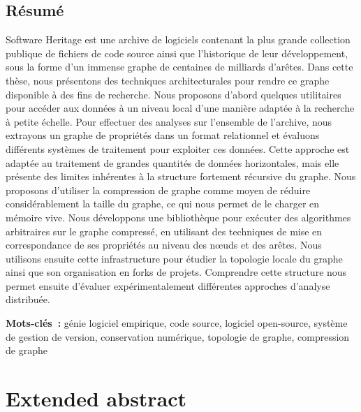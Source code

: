 \begin{minipage}[b][0.49\textheight][t]{0.96\textwidth}
\vspace{6mm}

\section*{Résumé}
\begin{SingleSpace}

Software Heritage est une archive de logiciels contenant la plus
grande collection publique de fichiers de code source ainsi que l'historique de
leur développement, sous la forme d'un immense graphe de centaines de milliards
d'arêtes. Dans cette thèse, nous présentons des techniques architecturales pour
rendre ce graphe disponible à des fins de recherche. Nous proposons d'abord
quelques utilitaires pour accéder aux données à un niveau local d'une manière
adaptée à la recherche à petite échelle. Pour effectuer des analyses sur
l'ensemble de l'archive, nous extrayons un graphe de propriétés dans un format
relationnel et évaluons différents systèmes de traitement pour exploiter ces
données. Cette approche est adaptée au traitement de grandes quantités de
données horizontales, mais elle présente des limites inhérentes à la structure
fortement récursive du graphe. Nous proposons d'utiliser la compression de
graphe comme moyen de réduire considérablement la taille du graphe, ce qui nous
permet de le charger en mémoire vive. Nous développons une bibliothèque pour
exécuter des algorithmes arbitraires sur le graphe compressé, en utilisant
des techniques de mise en correspondance de ses propriétés au
niveau des nœuds et des arêtes. Nous utilisons ensuite cette infrastructure
pour étudier la topologie locale du graphe ainsi que son organisation en forks
de projets. Comprendre cette structure nous permet ensuite
d'évaluer expérimentalement différentes approches d'analyse distribuée.

\vspace{3mm}

\textbf{Mots-clés~:} génie logiciel empirique, code source, logiciel
open-source, système de gestion de version, conservation numérique, topologie
de graphe, compression de graphe

\end{SingleSpace}
\end{minipage}

\clearpage

\chapter*{Extended abstract}

